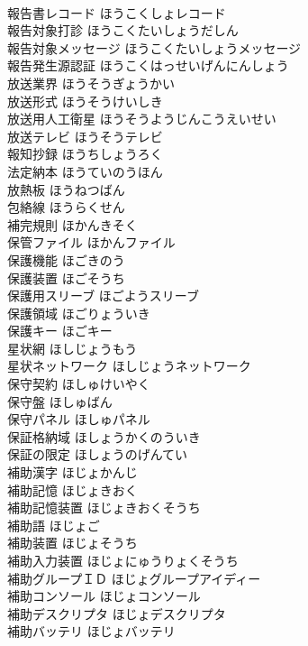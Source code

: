 \documentclass[8pt]{extreport}
\begin{document}
\begin{CJK}{UTF8}{min}
\\	報告書レコード	ほうこくしょレコード	
\\	報告対象打診	ほうこくたいしょうだしん	
\\	報告対象メッセージ	ほうこくたいしょうメッセージ	
\\	報告発生源認証	ほうこくはっせいげんにんしょう	
\\	放送業界	ほうそうぎょうかい	
\\	放送形式	ほうそうけいしき	
\\	放送用人工衛星	ほうそうようじんこうえいせい	
\\	放送テレビ	ほうそうテレビ	
\\	報知抄録	ほうちしょうろく	
\\	法定納本	ほうていのうほん	
\\	放熱板	ほうねつばん	
\\	包絡線	ほうらくせん	
\\	補完規則	ほかんきそく	
\\	保管ファイル	ほかんファイル	
\\	保護機能	ほごきのう	
\\	保護装置	ほごそうち	
\\	保護用スリーブ	ほごようスリーブ	
\\	保護領域	ほごりょういき	
\\	保護キー	ほごキー	
\\	星状網	ほしじょうもう	
\\	星状ネットワーク	ほしじょうネットワーク	
\\	保守契約	ほしゅけいやく	
\\	保守盤	ほしゅばん	
\\	保守パネル	ほしゅパネル	
\\	保証格納域	ほしょうかくのういき	
\\	保証の限定	ほしょうのげんてい	
\\	補助漢字	ほじょかんじ	
\\	補助記憶	ほじょきおく	
\\	補助記憶装置	ほじょきおくそうち	
\\	補助語	ほじょご	
\\	補助装置	ほじょそうち	
\\	補助入力装置	ほじょにゅうりょくそうち	
\\	補助グループＩＤ	ほじょグループアイディー	
\\	補助コンソール	ほじょコンソール	
\\	補助デスクリプタ	ほじょデスクリプタ	
\\	補助バッテリ	ほじょバッテリ	

\end{CJK}
\end{document}

